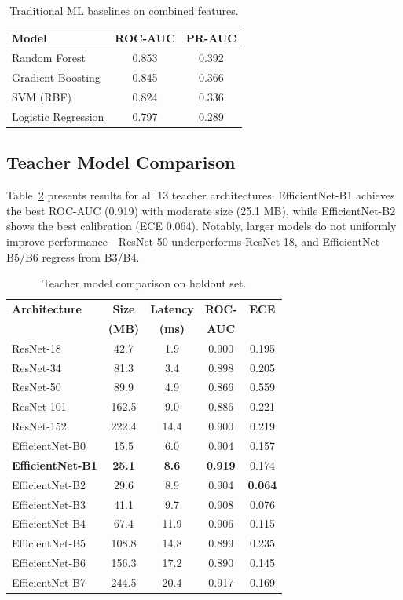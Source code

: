 \documentclass[conference]{IEEEtran}
\begin{document}
\begin{table}[t]
\centering
\caption{Traditional ML baselines on combined features.}
\label{tab:sklearn}
\begin{tabular}{lcc}
\toprule
\textbf{Model} & \textbf{ROC-AUC} & \textbf{PR-AUC} \\
\midrule
Random Forest & 0.853 & 0.392 \\
Gradient Boosting & 0.845 & 0.366 \\
SVM (RBF) & 0.824 & 0.336 \\
Logistic Regression & 0.797 & 0.289 \\
\bottomrule
\end{tabular}
\end{table}

\subsection{Teacher Model Comparison}

Table~\ref{tab:teachers} presents results for all 13 teacher architectures. EfficientNet-B1 achieves the best ROC-AUC (0.919) with moderate size (25.1 MB), while EfficientNet-B2 shows the best calibration (ECE 0.064). Notably, larger models do not uniformly improve performance---ResNet-50 underperforms ResNet-18, and EfficientNet-B5/B6 regress from B3/B4.

\begin{table}[t]
\centering
\caption{Teacher model comparison on holdout set.}
\label{tab:teachers}
\begin{tabular}{lcccc}
\toprule
\textbf{Architecture} & \textbf{Size} & \textbf{Latency} & \textbf{ROC-} & \textbf{ECE} \\
 & \textbf{(MB)} & \textbf{(ms)} & \textbf{AUC} & \\
\midrule
ResNet-18 & 42.7 & 1.9 & 0.900 & 0.195 \\
ResNet-34 & 81.3 & 3.4 & 0.898 & 0.205 \\
ResNet-50 & 89.9 & 4.9 & 0.866 & 0.559 \\
ResNet-101 & 162.5 & 9.0 & 0.886 & 0.221 \\
ResNet-152 & 222.4 & 14.4 & 0.900 & 0.219 \\
\midrule
EfficientNet-B0 & 15.5 & 6.0 & 0.904 & 0.157 \\
\textbf{EfficientNet-B1} & \textbf{25.1} & \textbf{8.6} & \textbf{0.919} & 0.174 \\
EfficientNet-B2 & 29.6 & 8.9 & 0.904 & \textbf{0.064} \\
EfficientNet-B3 & 41.1 & 9.7 & 0.908 & 0.076 \\
EfficientNet-B4 & 67.4 & 11.9 & 0.906 & 0.115 \\
EfficientNet-B5 & 108.8 & 14.8 & 0.899 & 0.235 \\
EfficientNet-B6 & 156.3 & 17.2 & 0.890 & 0.145 \\
EfficientNet-B7 & 244.5 & 20.4 & 0.917 & 0.169 \\
\bottomrule
\end{tabular}
\end{table}
\end{document}

